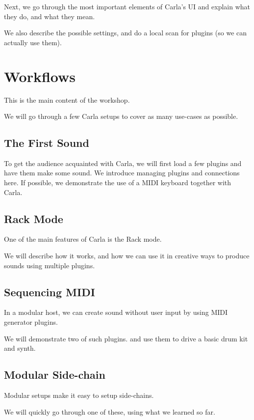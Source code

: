 \documentclass[11pt,a4paper]{article}
\begin{document}
Next, we go through the most important elements of Carla's UI and explain what they do, and what they mean.

We also describe the possible settings, and do a local scan for plugins (so we can actually use them).

\section{Workflows}

This is the main content of the workshop.

We will go through a few Carla setups to cover as many use-cases as possible.

\subsection{The First Sound}

To get the audience acquainted with Carla, we will first load a few plugins and have them make some sound.
We introduce managing plugins and connections here.
If possible, we demonstrate the use of a MIDI keyboard together with Carla.

\subsection{Rack Mode}

One of the main features of Carla is the Rack mode.

We will describe how it works, and how we can use it in creative ways to produce sounds using multiple plugins.

\subsection{Sequencing MIDI}

In a modular host, we can create sound without user input by using MIDI generator plugins.

We will demonstrate two of such plugins. and use them to drive a basic drum kit and synth.

\subsection{Modular Side-chain}

Modular setups make it easy to setup side-chains.

We will quickly go through one of these, using what we learned so far.
\end{document}
